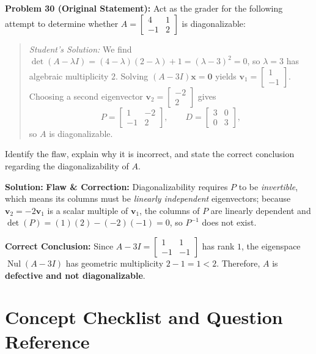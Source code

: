 \documentclass[11pt, letterpaper]{article}
\theoremstyle{definition}
\theoremstyle{remark}
\begin{document}
\vspace{0.8em}
\textbf{Problem 30 (Original Statement):}
Act as the grader for the following attempt to determine whether $A = \begin{bmatrix} 4 & 1 \\ -1 & 2 \end{bmatrix}$ is diagonalizable:
\begin{quote}
\emph{Student's Solution:} We find $\det(A - \lambda I) = (4-\lambda)(2-\lambda) + 1 = (\lambda - 3)^{2} = 0$, so $\lambda = 3$ has algebraic multiplicity $2$. Solving $(A - 3I)\mathbf{x} = \mathbf{0}$ yields $\mathbf{v}_{1} = \begin{bmatrix} 1 \\ -1 \end{bmatrix}$. Choosing a second eigenvector $\mathbf{v}_{2} = \begin{bmatrix} -2 \\ 2 \end{bmatrix}$ gives
\[
P = \begin{bmatrix} 1 & -2 \\ -1 & 2 \end{bmatrix}, \qquad D = \begin{bmatrix} 3 & 0 \\ 0 & 3 \end{bmatrix},
\]
so $A$ is diagonalizable.
\end{quote}
Identify the flaw, explain why it is incorrect, and state the correct conclusion regarding the diagonalizability of $A$.

\textbf{Solution:}
\textbf{Flaw \& Correction:} Diagonalizability requires $P$ to be \emph{invertible}, which means its columns must be \emph{linearly independent} eigenvectors; because $\mathbf{v}_{2} = -2\mathbf{v}_{1}$ is a scalar multiple of $\mathbf{v}_{1}$, the columns of $P$ are linearly dependent and $\det(P) = (1)(2) - (-2)(-1) = 0$, so $P^{-1}$ does not exist.

\textbf{Correct Conclusion:} Since $A - 3I = \begin{bmatrix} 1 & 1 \\ -1 & -1 \end{bmatrix}$ has rank $1$, the eigenspace $\operatorname{Nul}(A - 3I)$ has geometric multiplicity $2 - 1 = 1 < 2$. Therefore, $A$ is \textbf{defective and not diagonalizable}.

\newpage
\section{Concept Checklist and Question Reference}
\end{document}
